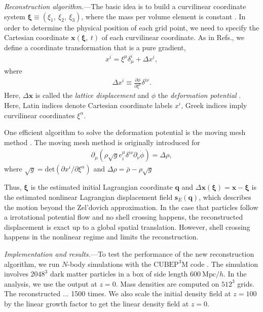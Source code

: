\documentclass[aps,prd,twocolumn,showpacs,superscriptaddress,groupedaddress,nofootinbib]{revtex4}  %
\newcommand{\mr}{\mathrm}
\newcommand{\bea}{\begin{eqnarray}}
\newcommand{\eea}{\end{eqnarray}}
\begin{document}

{\it Reconstruction algorithm.}---The basic idea is to build a curvilinear 
coordinate system $\bm{\xi}\equiv(\xi_1,\ \xi_2,\ \xi_3)$, where the mass per
volume element is constant \cite{1995ApJS..100..269P,1998ApJS..115...19P}. 
In order to determine the physical position of each grid point, we need to 
specify the Cartesian coordinate $\bm{x}(\bm{\xi},\ t)$ of each curvilinear 
coordinate.
As in Refs.\cite{1995ApJS..100..269P,1998ApJS..115...19P}, we define a coordinate transformation that is a pure gradient,
\bea
x^i=\xi^\mu\delta^i_\mu+\Delta x^i,
\eea
where
\bea
\Delta x^i\equiv\frac{\partial\phi}{\partial\xi^\nu}\delta^{i\nu}.
\eea
Here, $\Delta\bm{x}$ is called the {\it lattice displacement} and $\phi$ the 
{\it deformation potential} \cite{1995ApJS..100..269P,1998ApJS..115...19P}.
Here, Latin indices denote Cartesian coordinate labels $x^i$, Greek indices 
imply curvilinear coordinates $\xi^\alpha$.

One efficient algorithm to solve the deformation potential is the moving mesh
method \cite{1995ApJS..100..269P,1998ApJS..115...19P}.
The moving mesh method is originally introduced for 
\bea
\partial_\mu(\rho\sqrt{g}e^\mu_i\delta^{i\nu}\partial_\nu\dot{\phi})=\Delta\rho,
\eea
where $\sqrt{g}=\mr{det}(\partial x^i/\partial \xi^\alpha)$ and 
$\Delta\rho=\bar{\rho}-\rho\sqrt{g}$



Thus, $\bm{\xi}$ is the estimated initial Lagrangian coordinate $\bm{q}$ and 
$\Delta \bm{x}(\bm{\xi})=\bm{x}-\bm{\xi}$ is the estimated nonlinear Lagrangian
displacement field $\bm{s}_E(\bm{q})$, which describes the motion beyond the 
Zel'dovich approximation. 
In the case that particles follow a irrotational potential flow and no shell
crossing happens, the reconstructed displacement is exact up to a global 
spatial translation.
However, shell crossing happens in the nonlinear regime and limits the 
reconstruction.





{\it Implementation and results.}---To test the performance of 
the new reconstruction algorithm, we run $N$-body simulations with 
the $\mr{CUBEP}^3\mr{M}$ code \cite{2013code}.
The simulation involves $2048^3$ dark matter particles in a box of 
side length $600\ \mr{Mpc}/h$.
In the analysis, we use the output at $z=0$. Mass densities are computed
on $512^3$ grids. 
The reconstructed ... 1500 times.
We also scale the initial density field at $z=100$ by 
the linear growth factor to get the linear density field at $z=0$.
\end{document}
